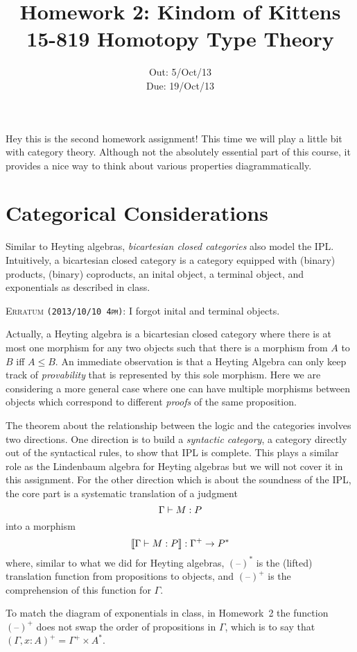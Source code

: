 \documentclass[12pt]{article}
\title{\Large\textbf{
  Homework 2: Kindom of Kittens}
\normalsize\\
15-819 Homotopy Type Theory}
\author{}
\date{%
Out: 5/Oct/13\\
Due: 19/Oct/13
}
\newcommand{\showextra}[1]{\color{DarkOliveGreen}#1\normalcolor}
\begin{document}
\maketitle

Hey this is the second homework assignment!
This time we will play a little bit with category theory.
Although not the absolutely essential part of this course,
it provides a nice way to think about various properties diagrammatically.

\section{Categorical Considerations}

Similar to Heyting algebras, \emph{bicartesian closed categories} also model the IPL.
Intuitively, a bicartesian closed category is a category
equipped with (binary) products,
(binary) coproducts,
\showextra{an inital object, a terminal object,}
and exponentials as described in class.
\showextra{
  \begin{mdframed}[style=extra]
    \textsc{Erratum \texttt{(2013/10/10 4pm)}:}
    I forgot inital and terminal objects.
  \end{mdframed}
}
Actually, a Heyting algebra is a bicartesian closed category
where there is at most one morphism for any two objects
such that there is a morphism from $A$ to $B$ iff $A \leq B$.
An immediate observation is that
a Heyting Algebra can only keep track of \emph{provability}
that is represented by this sole morphism.
Here we are considering a more general case where
one can have multiple morphisms between objects
which correspond to different \emph{proofs} of the same proposition.

The theorem about the relationship
between the logic and the categories
involves two directions.
One direction is to build a \emph{syntactic category},
a category directly out of the syntactical rules,
to show that IPL is complete.
This plays a similar role as the Lindenbaum algebra for Heyting algebras
but we will not cover it in this assignment.
For the other direction which is about the soundness of the IPL,
the core part is a systematic translation of a judgment
$$\Gamma \vdash M : P$$
into a morphism
$$\llbracket \Gamma \vdash M : P\rrbracket : \Gamma^+ \to P^*$$
where,
similar to what we did for Heyting algebras,
$(\text{--})^*$ is the (lifted) translation function from propositions to objects,
and $(\text{--})^+$ is the comprehension of this function for $\Gamma$.

\begin{remark}
  To match the diagram of exponentials in class,
  in Homework~2 the function $(\text{--})^+$
  does not swap the order of propositions in $\Gamma$,
  which is to say that $(\Gamma, x{:}A)^+ = \Gamma^+ \times A^*$.
\end{remark}
\end{document}
